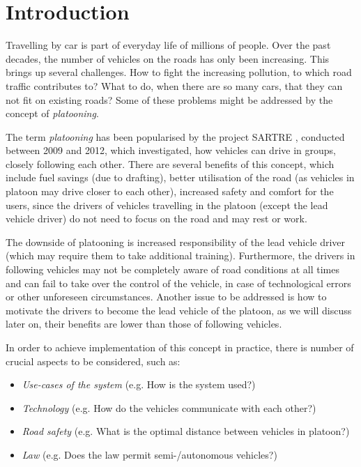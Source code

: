 \section{Introduction}
% 
Travelling by car is part of everyday life of millions of people. Over the past decades, the number of vehicles on the roads has only been increasing\footnotemark. This brings up several challenges. How to fight the increasing pollution, to which road traffic contributes to? What to do, when there are so many cars, that they can not fit on existing roads? Some of these problems might be addressed by the concept of \emph{platooning}.\par
% 
% 
The term \emph{platooning} has been popularised by the project SARTRE \cite{Chan2012ProjectSARTRE}, conducted between 2009 and 2012, which investigated, how vehicles can drive in groups, closely following each other. There are several benefits of this concept, which include fuel savings (due to drafting\footnotemark), better utilisation of the road (as vehicles in platoon may drive closer to each other), increased safety and comfort for the users, since the drivers of vehicles travelling in the platoon (except the lead vehicle driver) do not need to focus on the road and may rest or work.\par
% 
% 
The downside of platooning is increased responsibility of the lead vehicle driver (which may require them to take additional training). Furthermore, the drivers in following vehicles may not be completely aware of road conditions at all times and can fail to take over the control of the vehicle, in case of technological errors or other unforeseen circumstances. Another issue to be addressed is how to motivate the drivers to become the lead vehicle of the platoon, as we will discuss later on, their benefits are lower than those of following vehicles.\par
% 
In order to achieve implementation of this concept in practice, there is number of crucial aspects to be considered, such as:
\begin{itemize}[noitemsep]
    \item \emph{Use-cases of the system} (e.g. How is the system used?)
    \item \emph{Technology} (e.g. How do the vehicles communicate with each other?)
    \item \emph{Road safety} (e.g. What is the optimal distance between vehicles in platoon?)
    \item \emph{Law} (e.g. Does the law permit semi-/autonomous vehicles?)
\end{itemize} \par
